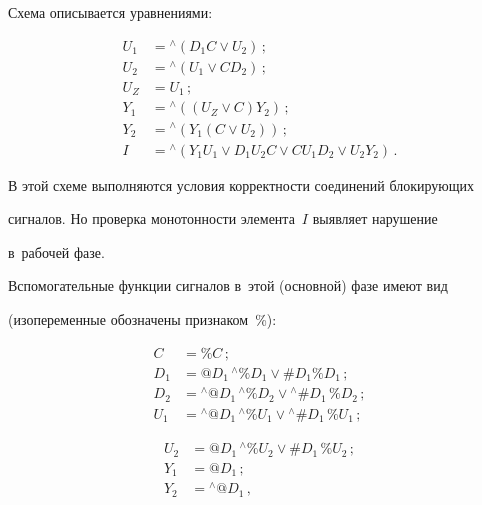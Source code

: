    


   Схема описывается уравнениями:


   \begin{align*}


   U_1& = {}^{\wedge}\left(D_1 C \vee U_2\right)\,;\\


   U_2& = {}^{\wedge} \left(U_1 \vee C D_2\right)\,;\\


   U_Z& = U_1\,;\\


   Y_1& = {}^{\wedge} \left(( U_Z \vee C) Y_2\right)\,;\\


   Y_2& = {}^{\wedge} \left(Y_1 (C \vee U_2)\right)\,;\\


   I &= {}^{\wedge}\left(Y_1 U_1 \vee D_1 U_2 C \vee C U_1 D_2 \vee U_2 Y_2\right)\,.


   \end{align*}


      В этой схеме выполняются условия корректности соединений блокирующих 


сигналов. Но проверка монотонности элемента~$I$ выявляет нарушение 


в~рабочей фазе.


   


   Вспомогательные функции сигналов в~этой (основной) фазе имеют вид 


(изопеременные обозначены признаком~\%):


   \begin{align*}


   C &= \%C\,;\\


   D_1& = @D_1 \,{}^{\wedge}\%D_1 \vee \#D_1 \%D_1\,;\\


   D_2 &= {}^{\wedge}@D_1\, {}^{\wedge}\%D_2 \vee {}^{\wedge}\#D_1\, \%D_2\,;\\


      U_1& = {}^{\wedge}@D_1 \,{}^{\wedge}\%U_1 \vee {}^{\wedge}\#D_1\, \%U_1\,;


\end{align*}





\noindent


   \begin{align*}


   U_2 &= @D_1 \,{}^{\wedge}\%U_2 \vee \#D_1 \,\%U_2\,;\\


   Y_1 &= @D_1\,;\\


   Y_2 &= {}^{\wedge}@D_1\,,


   \end{align*}


